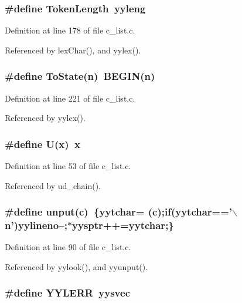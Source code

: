 \subsubsection{\setlength{\rightskip}{0pt plus 5cm}\#define Token\-Length~\bf{yyleng}}\label{c__list_8c_692047f631bf7b506efd8a24ee6eace3}




Definition at line 178 of file c\_\-list.c.

Referenced by lex\-Char(), and yylex().
\subsubsection{\setlength{\rightskip}{0pt plus 5cm}\#define To\-State(n)~BEGIN(n)}\label{c__list_8c_e4f339f05d10a7ba069f63a0d82ba7d4}




Definition at line 221 of file c\_\-list.c.

Referenced by yylex().
\subsubsection{\setlength{\rightskip}{0pt plus 5cm}\#define U(x)~x}\label{c__list_8c_2e9a0e2ee6ec47b10497aa3fa424707a}




Definition at line 53 of file c\_\-list.c.

Referenced by ud\_\-chain().
\subsubsection{\setlength{\rightskip}{0pt plus 5cm}\#define unput(c)~\{\bf{yytchar}= (c);if(\bf{yytchar}=='$\backslash$n')\bf{yylineno}--;$\ast$\bf{yysptr}++=\bf{yytchar};\}}\label{c__list_8c_448a4e9041a09588332733c6846c770c}




Definition at line 90 of file c\_\-list.c.

Referenced by yylook(), and yyunput().
\subsubsection{\setlength{\rightskip}{0pt plus 5cm}\#define YYLERR~\bf{yysvec}}\label{c__list_8c_21cf66c12b75036afb2bb450961f3913}




